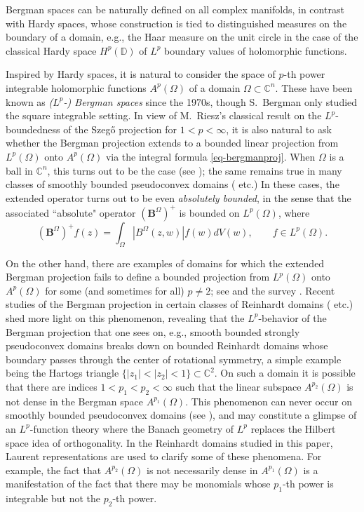 \documentclass[letterpaper,11pt,reqno]{amsart}
\theoremstyle{plain}
\theoremstyle{definition}
\theoremstyle{remark}
\theoremstyle{remark}
\numberwithin{equation}{section}
\newcommand{\abs}[1]{\left\vert#1\right\vert}
\newcommand{\cx}{{\mathbb C}}
\newcommand{\D}{{\mathbb D}}
\begin{document}
Bergman spaces can be naturally defined on all complex manifolds, in contrast with  Hardy spaces,  whose construction is tied to distinguished measures on the boundary of a domain, e.g., the Haar measure on the unit circle in the case of the classical Hardy space $H^p(\D)$ of $L^p$ boundary values of holomorphic functions.

Inspired by  Hardy spaces, it is natural to consider the space of $p$-th power integrable holomorphic functions $A^p(\Omega)$ of a domain $\Omega\subset \cx^n$. 
These have been known as \emph{($L^p$-)  Bergman spaces} since the 1970s, though S.~Bergman only studied the square integrable setting. 
In view of M.~Riesz's classical result  on the $L^p$-boundedness of the Szeg\H{o} projection for $1<p<\infty$, it is also natural to ask whether the Bergman projection extends to a bounded linear projection from $L^p(\Omega)$ onto $A^p(\Omega)$ via the integral formula \eqref{eq-bergmanproj}.  
When $\Omega$ is a ball in $\cx^n$, this turns out to be the case (see \cite{ZahJud64,ForRud74}); the same remains true in many classes of smoothly bounded pseudoconvex domains (\cite{PhoSte77,NagRosSteWai89,McNSte94,McNeal94} etc.)
In these cases, the extended operator turns out to be even \emph{absolutely bounded}, in the sense that the associated ``absolute" operator $(\bm{B}^\Omega)^+$ is bounded on $L^p(\Omega)$, where
\[
(\bm{B}^\Omega)^+ f(z)= \int_\Omega \abs{B^\Omega(z,w)} f(w)dV(w), \qquad f\in L^p(\Omega).
\]

On the other hand, there are examples of domains for which the extended Bergman projection fails to  define  a bounded projection from $L^p(\Omega)$ onto $A^p(\Omega)$ for some (and sometimes for all) $p\not=2$; see \cite{barrett84, BekBon95, krantz1, krantz2, zeytuncu2013, EdhMcN16b} and the survey \cite{zeytuncu2020}. 
Recent studies of the Bergman projection in certain classes of Reinhardt domains (\cite{chakzeytuncu, Edh16, EdhMcN16, Chen17, ChEdMc19, EdhMcN20, HuoWick2020a, zhang1, zhang2, monguzzi, bcem} etc.) shed more light on this phenomenon, revealing that the $L^p$-behavior of the Bergman projection that one sees on, e.g., smooth bounded strongly pseudoconvex domains breaks down on bounded Reinhardt domains whose boundary passes through the center of rotational symmetry, a simple example being the Hartogs triangle $\{\abs{z_1}<\abs{z_2}<1\}\subset \cx^2$. 
On such a domain it is possible that there are indices $1<p_1<p_2<\infty$ such that the linear subspace $A^{p_2}(\Omega)$ is not dense in the Bergman space $A^{p_1}(\Omega)$. 
This phenomenon can never occur on smoothly bounded pseudoconvex domains (see \cite{catlin}), and may constitute a glimpse of an  $L^p$-function theory where the Banach geometry of $L^p$ replaces the  Hilbert space idea of orthogonality. 
In the Reinhardt domains studied in this paper, Laurent representations are used to clarify some of these phenomena. 
For example, the fact that $A^{p_2}(\Omega)$ is not necessarily dense in $A^{p_1}(\Omega)$ is a manifestation of the fact that there may be monomials whose $p_1$-th power is integrable but not the $p_2$-th power. 
\end{document}
